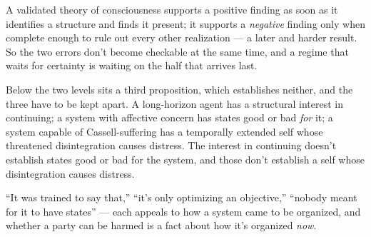 
A validated theory of consciousness supports a positive finding as soon as it identifies a structure and finds it present; it supports a \emph{negative} finding only when complete enough to rule out every other realization — a later and harder result. So the two errors don't become checkable at the same time, and a regime that waits for certainty is waiting on the half that arrives last.

Below the two levels sits a third proposition, which establishes neither, and the three have to be kept apart. A long-horizon agent has a structural interest in continuing; a system with affective concern has states good or bad \emph{for} it; a system capable of Cassell-suffering has a temporally extended self whose threatened disintegration causes distress. The interest in continuing doesn't establish states good or bad for the system, and those don't establish a self whose disintegration causes distress.


“It was trained to say that,” “it's only optimizing an objective,” “nobody meant for it to have states” — each appeals to how a system came to be organized, and whether a party can be harmed is a fact about how it's organized \emph{now}.

